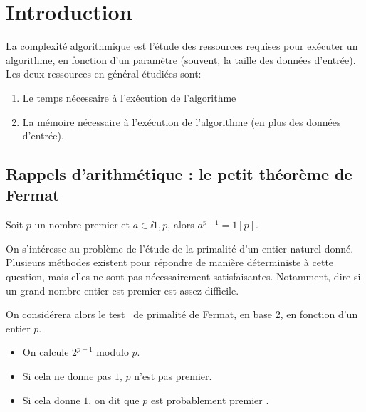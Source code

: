 \section{Introduction}

\begin{defi}[Complexité]
  La complexité algorithmique est l'étude des ressources requises pour
  exécuter un algorithme, en fonction d'un paramètre (souvent, la
  taille des données d'entrée). Les deux
  ressources en général étudiées sont:
  \begin{enumerate}
  \item Le temps nécessaire à l'exécution de l'algorithme
  \item La mémoire nécessaire à l'exécution de l'algorithme (en plus
    des données d'entrée).
  \end{enumerate}
\end{defi}


%

\subsection{Rappels d'arithmétique : le petit théorème de Fermat}

\begin{theorem}[de Fermat]
  Soit $p$ un nombre premier et $a \in \ii{1,p}$, alors $a^{p-1} = 1 [p]$.
\end{theorem}

On s'intéresse au problème de l'étude de la primalité d'un entier naturel donné. 
Plusieurs méthodes existent pour répondre de manière déterministe à cette question, mais elles ne sont pas nécessairement satisfaisantes. 
Notamment, dire si un grand nombre entier est premier est assez difficile. 

On considérera alors le \og test \fg\ de primalité de Fermat, en base 2, en fonction d'un entier $p$.
\begin{itemize}
  \item On calcule $2^{p-1}$ modulo $p$. 
  \item Si cela ne donne pas $1$, $p$ n'est pas premier. 
  \item Si cela donne $1$, on dit que \og $p$ est probablement premier \fg.
\end{itemize}

